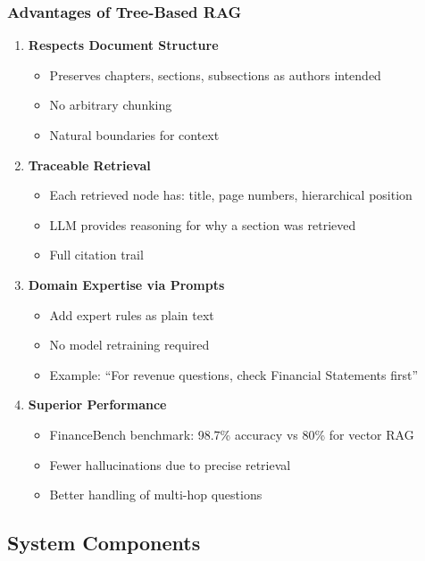 \documentclass[12pt,a4paper]{article}
\begin{document}
\subsubsection{Advantages of Tree-Based RAG}

\begin{enumerate}
    \item \textbf{Respects Document Structure}
    \begin{itemize}
        \item Preserves chapters, sections, subsections as authors intended
        \item No arbitrary chunking
        \item Natural boundaries for context
    \end{itemize}
    
    \item \textbf{Traceable Retrieval}
    \begin{itemize}
        \item Each retrieved node has: title, page numbers, hierarchical position
        \item LLM provides reasoning for why a section was retrieved
        \item Full citation trail
    \end{itemize}
    
    \item \textbf{Domain Expertise via Prompts}
    \begin{itemize}
        \item Add expert rules as plain text
        \item No model retraining required
        \item Example: ``For revenue questions, check Financial Statements first''
    \end{itemize}
    
    \item \textbf{Superior Performance}
    \begin{itemize}
        \item FinanceBench benchmark: 98.7\% accuracy vs 80\% for vector RAG
        \item Fewer hallucinations due to precise retrieval
        \item Better handling of multi-hop questions
    \end{itemize}
\end{enumerate}

\subsection{System Components}
\end{document}
